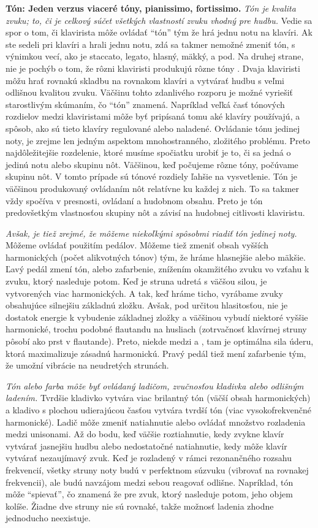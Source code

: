 \textbf{Tón: Jeden verzus viaceré tóny, pianissimo, fortissimo.} \emph{Tón je kvalita zvuku; to, či je celkový súčet všetkých vlastností zvuku vhodný pre hudbu.} Vedie sa spor o tom, či klavirista môže ovládať “tón” tým že hrá jednu notu na klavíri. Ak ste  sedeli pri klavíri a hrali jednu notu, zdá sa takmer nemožné zmeniť tón, s výnimkou vecí, ako je staccato, legato, hlasný, mäkký, a pod. Na druhej strane, nie je pochýb o tom, že rôzni klaviristi produkujú rôzne tóny . Dvaja klaviristi môžu hrať rovnakú skladbu na rovnakom klavíri a vytvárať hudbu s veľmi odlišnou kvalitou zvuku. Väčšinu tohto zdanlivého rozporu je možné vyriešiť starostlivým skúmaním, čo “tón” znamená. Napríklad veľká časť tónových rozdielov medzi klaviristami môže byť pripísaná tomu aké klavíry používajú, a spôsob, ako sú tieto klavíry regulované alebo naladené. Ovládanie tónu jedinej noty, je zrejme len jedným aspektom mnohostranného, zložitého problému. Preto najdôležitejšie rozdelenie, ktoré musíme spočiatku urobiť je to, či sa jedná o jedinú notu alebo skupinu nôt. Väčšinou, keď počujeme rôzne tóny, počúvame skupinu nôt. V tomto prípade sú tónové rozdiely ľahšie na vysvetlenie. Tón je väčšinou produkovaný ovládaním nôt relatívne ku každej z nich. To sa takmer vždy spočíva v presnosti, ovládaní a hudobnom obsahu. Preto je tón predovšetkým vlastnosťou skupiny nôt a závisí na hudobnej citlivosti klaviristu.

\emph{Avšak, je tiež zrejmé, že  môžeme  niekoľkými spôsobmi riadiť tón jedinej noty.} Môžeme ovládať použitím pedálov. Môžeme tiež zmeniť obsah vyšších harmonických (počet alikvotných tónov) tým, že hráme hlasnejšie alebo mäkšie. Ľavý pedál zmení tón, alebo zafarbenie, znížením okamžitého zvuku vo vzťahu k zvuku, ktorý nasleduje potom. Keď je struna udretá s väčšou silou, je vytvorených viac harmonických. A tak, keď hráme ticho, vyrábame zvuky obsahujúce silnejšiu základnú zložku. Avšak, pod určitou hlasitosťou, nie je dostatok energie k vybudenie základnej zložky a väčšinou vybudí niektoré vyššie harmonické, trochu podobné flautandu na husliach (zotrvačnosť klavírnej struny pôsobí ako prst v flautande). Preto, niekde medzi  a , tam je optimálna sila úderu, ktorá maximalizuje zásadnú harmonickú. Pravý pedál tiež mení zafarbenie tým, že umožní vibrácie na neudretých strunách.

\emph{Tón alebo farba môže byť ovládaný ladičom, zvučnosťou kladivka alebo odlišným ladením.} Tvrdšie kladivko vytvára viac brilantný tón (väčší obsah harmonických) a kladivo s plochou udierajúcou časťou vytvára tvrdší tón (viac vysokofrekvenčné harmonické). Ladič môže zmeniť natiahnutie alebo ovládať množstvo rozladenia medzi unisonami. Až do bodu, keď väčšie roztiahnutie, kedy zvykne klavír vytvárať jasnejšiu hudbu alebo nedostatočné natiahnutie, kedy môže klavír vytvárať nezaujímavý zvuk. Keď je rozladený v rámci rezonančného rozsahu frekvencií, všetky struny noty budú v perfektnom súzvuku (vibrovať na rovnakej frekvencii), ale budú navzájom medzi sebou reagovať odlišne. Napríklad, tón môže “spievať”, čo znamená že pre zvuk, ktorý nasleduje potom, jeho objem kolíše. Žiadne dve struny nie sú rovnaké, takže možnosť ladenia zhodne jednoducho neexistuje.

